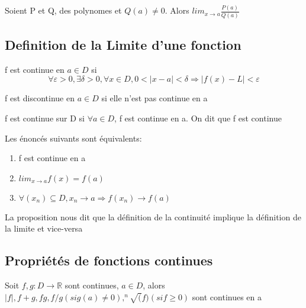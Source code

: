 \documentclass{article}
\begin{document}
\begin{corollary}
    Soient P et Q, des polynomes et $Q(a) \neq 0$. Alors
    $ lim_{x \to a} \frac{P(a)}{Q(a)}$
\end{corollary}

\subsection{Definition de la Limite d'une fonction}

\begin{definition}
    f est continue en $a \in D$ si
    $$ \forall \varepsilon > 0 , \exists \delta > 0, \forall x \in D,
    0 < |x-a|< \delta \Longrightarrow |f(x) -L| < \varepsilon$$
\end{definition}

\begin{definition}
    f est discontinue en $a \in D$ si elle n'est pas continue en a
\end{definition}

\begin{definition}
    f est continue sur D si $\forall a \in D$, f est continue en a.
    On dit que f est continue
\end{definition}

\begin{proposition}
    Les énoncés suivants sont équivalents:
    \begin{enumerate}
	\item f est continue en a
	\item $ lim_{x \to a} f(x) = f(a)$
	\item $\forall (x_n) \subseteq D, x_n \to a \Longrightarrow
	    f(x_n) \to f(a)$
    \end{enumerate}
\end{proposition}

\begin{intuition}
    La proposition nous dit que la définition de la continuité implique
    la définition de la limite et vice-versa
\end{intuition}

\subsection{Propriétés de fonctions continues}

\begin{proposition}
    Soit $f,g:D \to \mathbb{R}$ sont continues, $a \in D$, alors $|f|,
    f+g, fg, f/g (si g(a) \neq 0), ^n\sqrt(f) (si f \geq 0)$ sont
    continues en a
\end{proposition}
\end{document}
